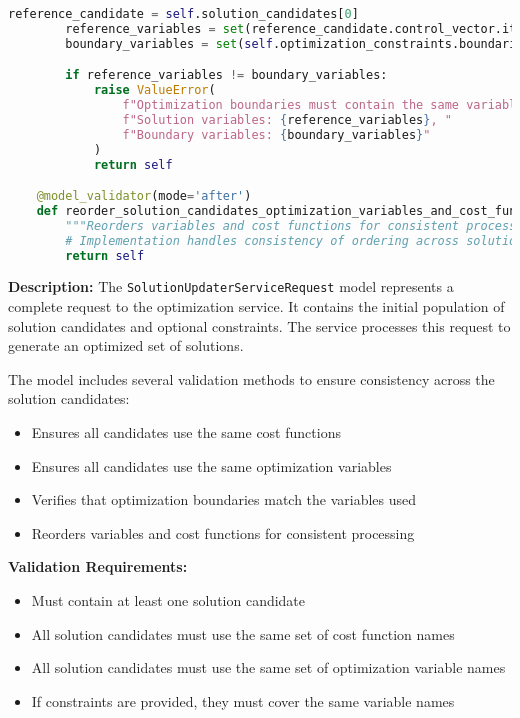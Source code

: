 \begin{lstlisting}[language=Python, caption={SolutionUpdaterServiceRequest model with complex validation logic}]
		reference_candidate = self.solution_candidates[0]
		reference_variables = set(reference_candidate.control_vector.items.keys())
		boundary_variables = set(self.optimization_constraints.boundaries.keys())

		if reference_variables != boundary_variables:
			raise ValueError(
				f"Optimization boundaries must contain the same variables as solution candidates. "
				f"Solution variables: {reference_variables}, "
				f"Boundary variables: {boundary_variables}"
			)
			return self

	@model_validator(mode='after')
	def reorder_solution_candidates_optimization_variables_and_cost_functions(self) -> 'SolutionUpdaterServiceRequest':
		"""Reorders variables and cost functions for consistent processing."""
		# Implementation handles consistency of ordering across solution candidates
		return self
\end{lstlisting}

\textbf{Description:}
The \texttt{SolutionUpdaterServiceRequest} model represents a complete request to the optimization service. It contains the initial population of solution candidates and optional constraints. The service processes this request to generate an optimized set of solutions.

The model includes several validation methods to ensure consistency across the solution candidates:
\begin{itemize}
	\item Ensures all candidates use the same cost functions
	\item Ensures all candidates use the same optimization variables
	\item Verifies that optimization boundaries match the variables used
	\item Reorders variables and cost functions for consistent processing
\end{itemize}

\textbf{Validation Requirements:}
\begin{itemize}
	\item Must contain at least one solution candidate
	\item All solution candidates must use the same set of cost function names
	\item All solution candidates must use the same set of optimization variable names
	\item If constraints are provided, they must cover the same variable names
\end{itemize}

